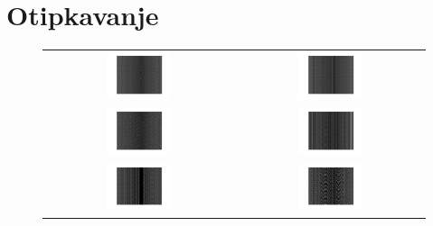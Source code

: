 \documentclass[12pt, a4]{report}
\begin{document}
        \section{Otipkavanje}
            \begin{enumerate}
                \begin{figure}[ht]
                    \centering
                    \begin{tabular}{cc}
                        \includegraphics[width=0.35\textwidth]{sample_1} & \includegraphics[width=0.35\textwidth]{sample_2} \\
                        \includegraphics[width=0.35\textwidth]{sample_3} & \includegraphics[width=0.35\textwidth]{sample_4} \\
                        \includegraphics[width=0.35\textwidth]{sample_5} & \includegraphics[width=0.35\textwidth]{sample_6} \\

\end{tabular}
\end{figure}
\end{enumerate}
\end{document}
